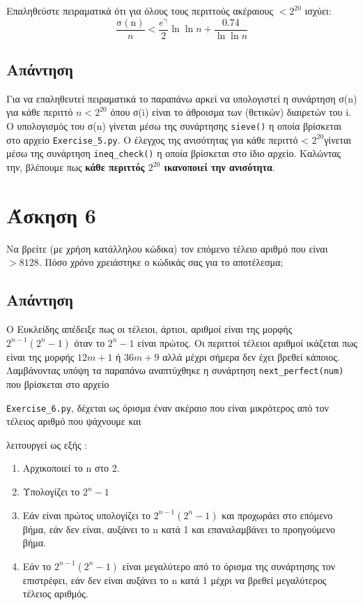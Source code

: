 \documentclass[12pt]{article}
\begin{document}
Επαληθεύστε πειραματικά ότι για όλους τους περιττούς ακέραιους \( < 2^{20} \) ισχύει:
\[ \frac{\text{σ}(\text{n})}{n} < \frac{e^\text{γ}}{2}\ln{\ln{n} + \frac{0.74}{\ln{\ln{n}}}} 
\]

\subsection*{Απάντηση}
Για να επαληθευτεί πειραματικά το παραπάνω αρκεί να υπολογιστεί η συνάρτηση σ(n) για κάθε περιττό \( n < 2^{20} \) όπου σ(i) είναι το άθροισμα των (θετικών) διαιρετών του i. 
\newline
\newline
Ο υπολογισμός του σ(n) γίνεται μέσω της συνάρτησης \texttt{sieve()} η οποία βρίσκεται στο αρχείο \texttt{Exercise\_5.py}. Ο έλεγχος της ανισότητας για κάθε περιττό < \( 2^{20} \)γίνεται μέσω της συνάρτηση \texttt{ineq\_check()} η οποία βρίσκεται στο ίδιο αρχείο. Καλώντας την, βλέπουμε πως \textbf{κάθε περιττός \( 2^{20} \) ικανοποιεί την ανισότητα}.
\hfill \blacksquare
\section*{Άσκηση 6}

Να βρείτε (με χρήση κατάλληλου κώδικα) τον επόμενο τέλειο αριθμό που είναι \( >8128 \). Πόσο χρόνο χρειάστηκε ο κώδικάς σας για το αποτέλεσμα; 

\subsection*{Απάντηση}
Ο Ευκλείδης απέδειξε πως οι τέλειοι, άρτιοι, αριθμοί είναι της μορφής \(2^{n-1} (2^n -1) \)
όταν το \( 2^n - 1 \) είναι πρώτος. Οι περιττοί τέλειοι αριθμοί ικάζεται πως είναι της μορφής \( 12m + 1 \) ή \( 36m + 9 \) αλλά μέχρι σήμερα δεν έχει βρεθεί κάποιος. 
\newline
\newline
Λαμβάνοντας υπόψη τα παραπάνω αναπτύχθηκε η συνάρτηση \texttt{next\_perfect(num)} που βρίσκεται στο αρχείο 

\texttt{Exercise\_6.py}, δέχεται ως όρισμα έναν ακέραιο που είναι μικρότερος από τον τέλειος αριθμό που ψάχνουμε και 

λειτουργεί ως εξής :
\begin{enumerate}
    \item Αρχικοποιεί το n στο 2.
    \item Υπολογίζει το \(2^n -1\)
    \item Εάν είναι πρώτος υπολογίζει το \(2^{n-1}(2^n-1) \) και προχωράει στο επόμενο βήμα, εάν δεν είναι, αυξάνει το n κατά 1 και επαναλαμβάνει το προηγούμενο βήμα. 
    \item Εάν το \(2^{n-1}(2^n-1) \) είναι μεγαλύτερο από το όρισμα της συνάρτησης τον επιστρέφει, εάν δεν είναι αυξάνει το n κατά 1 μέχρι να βρεθεί μεγαλύτερος τέλειος αριθμός.
\end{enumerate}
\end{document}
